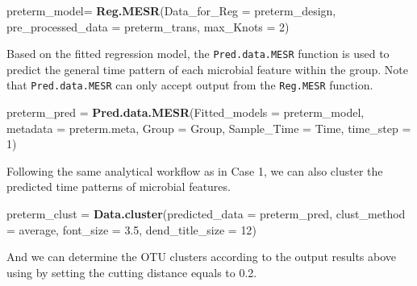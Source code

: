 \documentclass[
]{article}
\newenvironment{Shaded}{\begin{snugshade}}{\end{snugshade}}
\newcommand{\AttributeTok}[1]{\textcolor[rgb]{0.13,0.29,0.53}{#1}}
\newcommand{\DecValTok}[1]{\textcolor[rgb]{0.00,0.00,0.81}{#1}}
\newcommand{\FloatTok}[1]{\textcolor[rgb]{0.00,0.00,0.81}{#1}}
\newcommand{\FunctionTok}[1]{\textcolor[rgb]{0.13,0.29,0.53}{\textbf{#1}}}
\newcommand{\NormalTok}[1]{#1}
\newcommand{\OtherTok}[1]{\textcolor[rgb]{0.56,0.35,0.01}{#1}}
\newcommand{\StringTok}[1]{\textcolor[rgb]{0.31,0.60,0.02}{#1}}
\begin{document}
\begin{Shaded}
\begin{Highlighting}[]
\NormalTok{preterm\_model}\OtherTok{=} \FunctionTok{Reg.MESR}\NormalTok{(}\AttributeTok{Data\_for\_Reg =}\NormalTok{ preterm\_design,}
                        \AttributeTok{pre\_processed\_data =}\NormalTok{ preterm\_trans,}
                        \AttributeTok{max\_Knots =} \DecValTok{2}\NormalTok{)}
\end{Highlighting}
\end{Shaded}

Based on the fitted regression model, the \texttt{Pred.data.MESR}
function is used to predict the general time pattern of each microbial
feature within the group. Note that \texttt{Pred.data.MESR} can only
accept output from the \texttt{Reg.MESR} function.

\begin{Shaded}
\begin{Highlighting}[]
\NormalTok{preterm\_pred }\OtherTok{=} \FunctionTok{Pred.data.MESR}\NormalTok{(}\AttributeTok{Fitted\_models =}\NormalTok{ preterm\_model,}
                              \AttributeTok{metadata =}\NormalTok{ preterm.meta,}
                              \AttributeTok{Group =} \StringTok{\textquotesingle{}Group\textquotesingle{}}\NormalTok{,}
                              \AttributeTok{Sample\_Time =} \StringTok{\textquotesingle{}Time\textquotesingle{}}\NormalTok{,}
                              \AttributeTok{time\_step =} \DecValTok{1}\NormalTok{)}
\end{Highlighting}
\end{Shaded}

Following the same analytical workflow as in Case 1, we can also cluster
the predicted time patterns of microbial features.

\begin{Shaded}
\begin{Highlighting}[]
\NormalTok{preterm\_clust }\OtherTok{=} \FunctionTok{Data.cluster}\NormalTok{(}\AttributeTok{predicted\_data =}\NormalTok{ preterm\_pred,}
                             \AttributeTok{clust\_method =} \StringTok{\textquotesingle{}average\textquotesingle{}}\NormalTok{,}
                             \AttributeTok{font\_size =} \FloatTok{3.5}\NormalTok{,}
                             \AttributeTok{dend\_title\_size =} \DecValTok{12}\NormalTok{)}
\end{Highlighting}
\end{Shaded}

And we can determine the OTU clusters according to the output results
above using  by setting the cutting distance
equals to 0.2.
\end{document}
